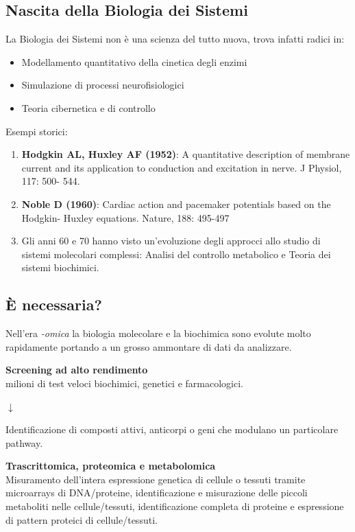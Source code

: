 \documentclass{article}
\begin{document}
\subsection{Nascita della Biologia dei Sistemi}
La Biologia dei Sistemi non è una scienza del tutto nuova, trova infatti radici in:
\begin{itemize}
    \item Modellamento quantitativo della cinetica degli enzimi
    \item Simulazione di processi neurofisiologici
    \item Teoria cibernetica e di controllo
\end{itemize}
Esempi storici:
\begin{enumerate}
    \item \textbf{Hodgkin AL, Huxley AF (1952)}: A quantitative description of membrane current
    and its application to conduction and excitation in nerve. J Physiol, 117: 500-
    544.
    \item \textbf{Noble D (1960)}: Cardiac action and pacemaker potentials based on the Hodgkin-
    Huxley equations. Nature, 188: 495-497
    \item[] Gli anni 60 e 70 hanno visto un'evoluzione degli approcci allo studio di sistemi molecolari complessi: Analisi del controllo metabolico e Teoria dei sistemi biochimici.
\end{enumerate}
\subsection{È necessaria?}
Nell'era \textit{-omica} la biologia molecolare e la biochimica sono evolute molto rapidamente portando a un grosso ammontare di dati da analizzare.\\
\begin{minipage}[c]{.5\textwidth}
    \raggedright
    \textbf{Screening ad alto rendimento}\\
    milioni di test veloci biochimici, genetici e farmacologici.
    \begin{center}
        $\downarrow$
    \end{center}
    Identificazione di composti attivi, anticorpi o geni che modulano un particolare pathway.
\end{minipage}%
\begin{minipage}[c]{.5\textwidth}
    \textbf{Trascrittomica, proteomica e metabolomica}\\
    Misuramento dell'intera espressione genetica di cellule o tessuti tramite microarrays di DNA/proteine, identificazione e misurazione delle piccoli metaboliti nelle cellule/tessuti, identificazione completa di proteine e espressione di pattern proteici di cellule/tessuti.
\end{minipage}\\
\end{document}
